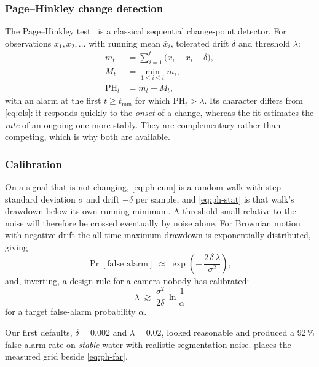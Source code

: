 \subsubsection{Page--Hinkley change detection}
\label{sec:ph}

The Page--Hinkley test~\citep{page1954continuous,hinkley1971inference} is a
classical sequential change-point detector. For observations $x_1, x_2, \dots$
with running mean $\bar{x}_i$, tolerated drift $\delta$ and threshold
$\lambda$:
\begin{align}
  m_t &= \sum_{i=1}^{t} \bigl( x_i - \bar{x}_i - \delta \bigr),
  \label{eq:ph-cum}\\
  M_t &= \min_{1 \le i \le t} m_i,
  \label{eq:ph-min}\\
  \mathrm{PH}_t &= m_t - M_t,
  \label{eq:ph-stat}
\end{align}
with an alarm at the first $t \ge t_{\min}$ for which
$\mathrm{PH}_t > \lambda$. Its character differs from \cref{eq:ols}: it
responds quickly to the \emph{onset} of a change, whereas the fit estimates
the \emph{rate} of an ongoing one more stably. They are complementary rather
than competing, which is why both are available.

\subsubsection{Calibration}
\label{sec:ph-calibration}

On a signal that is not changing, \cref{eq:ph-cum} is a random walk with step
standard deviation $\sigma$ and drift $-\delta$ per sample, and
\cref{eq:ph-stat} is that walk's drawdown below its own running minimum. A
threshold small relative to the noise will therefore be crossed eventually by
noise alone. For Brownian motion with negative drift the all-time maximum
drawdown is exponentially distributed, giving
\begin{equation}
  \Pr[\text{false alarm}] \;\approx\;
  \exp\!\left( -\,\frac{2\,\delta\,\lambda}{\sigma^{2}} \right),
  \label{eq:ph-far}
\end{equation}
and, inverting, a design rule for a camera nobody has calibrated:
\begin{equation}
  \lambda \;\gtrsim\; \frac{\sigma^{2}}{2\delta}\,\ln\frac{1}{\alpha}
  \label{eq:ph-design}
\end{equation}
for a target false-alarm probability $\alpha$.

Our first defaults, $\delta = 0.002$ and $\lambda = 0.02$, looked reasonable
and produced a 92\,\% false-alarm rate on \emph{stable} water with realistic
segmentation noise.  places the measured grid beside
\cref{eq:ph-far}.

